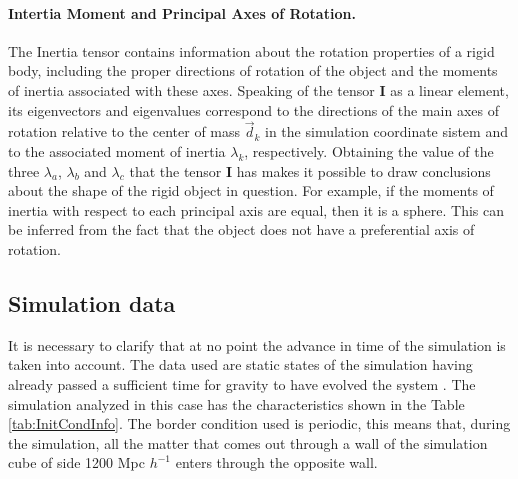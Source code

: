 \documentclass[a4paper,fleqn,usenatbib]{mnras}
\begin{document}
\paragraph{Intertia Moment and Principal Axes of Rotation. }
The Inertia tensor contains information about the rotation properties of a rigid body, including the proper directions of rotation of the object and the moments of inertia associated with these axes. Speaking of the tensor \textbf{I} as a linear element, its eigenvectors and eigenvalues correspond to the directions of the main axes of rotation relative to the center of mass $\Vec{d}_k$ in the simulation coordinate sistem and to the associated moment of inertia $\lambda_k$, respectively.
Obtaining the value of the three $\lambda_a$, $\lambda_b$ and $\lambda_c$ that the tensor \textbf{I} has makes it possible to draw conclusions about the shape of the rigid object in question. For example, if the moments of inertia with respect to each principal axis are equal, then it is a sphere. This can be inferred from the fact that the object does not have a preferential axis of rotation.

\subsection{Simulation data}
\label{sec:SIMDATA}
It is necessary to clarify that at no point the advance in time of the simulation is taken into account. The data used are static states of the simulation having already passed a sufficient time for gravity to have evolved the system .
The simulation analyzed\cite{SimData} in this case has the characteristics shown in the Table \ref{tab:InitCondInfo}. The border condition used is periodic, this means that, during the simulation, all the matter that comes out through a wall of the simulation cube of side 1200 Mpc $h^{-1}$  enters through the opposite wall.
\end{document}
